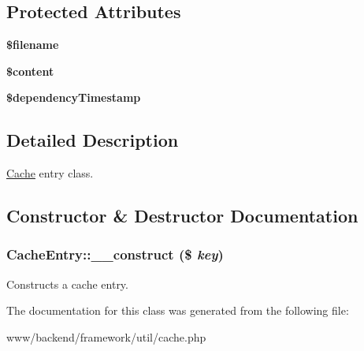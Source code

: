 \subsection*{Protected Attributes}
\begin{DoxyCompactItemize}
\item 
\hypertarget{classCacheEntry_ac11c681c4b4009fba88f434e68059aec}{
{\bfseries \$filename}}
\label{classCacheEntry_ac11c681c4b4009fba88f434e68059aec}

\item 
\hypertarget{classCacheEntry_aa9c63a7629576b1f2931eae85bf400f2}{
{\bfseries \$content}}
\label{classCacheEntry_aa9c63a7629576b1f2931eae85bf400f2}

\item 
\hypertarget{classCacheEntry_a1087e8d5ad9248b5af60a51b75c67555}{
{\bfseries \$dependencyTimestamp}}
\label{classCacheEntry_a1087e8d5ad9248b5af60a51b75c67555}

\end{DoxyCompactItemize}


\subsection{Detailed Description}
\hyperlink{classCache}{Cache} entry class. 

\subsection{Constructor \& Destructor Documentation}
\hypertarget{classCacheEntry_a827f326a6ca9262dd01769dff2fd302c}{
\subsubsection[{\_\-\_\-construct}]{\setlength{\rightskip}{0pt plus 5cm}CacheEntry::\_\-\_\-construct (\$ {\em key})}}
\label{classCacheEntry_a827f326a6ca9262dd01769dff2fd302c}
Constructs a cache entry. 

The documentation for this class was generated from the following file:\begin{DoxyCompactItemize}
\item 
www/backend/framework/util/cache.php\end{DoxyCompactItemize}
